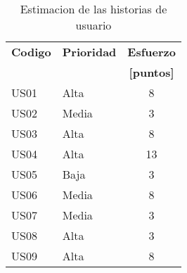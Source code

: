 \begin{table}[H]

  \begin{center}
    \begin{tabularx}{0.5\textwidth}{ XXc }
      \toprule
        \textbf{Codigo} &
        \textbf{Prioridad} &
        \textbf{Esfuerzo} \\
        &&\textbf{[puntos]} \\

      \midrule
      US01 & Alta & 8 \\
      US02 & Media & 3 \\
      US03 & Alta & 8 \\
      US04 & Alta & 13 \\
      US05 & Baja & 3 \\
      US06 & Media & 8 \\
      US07 & Media & 3 \\
      US08 & Alta & 3 \\
      US09 & Alta & 8 \\


      \bottomrule
    \end{tabularx}
    \caption{Estimacion de las historias de usuario}
    \label{tab:estimation_user_stories}
  \end{center}
\end{table}
